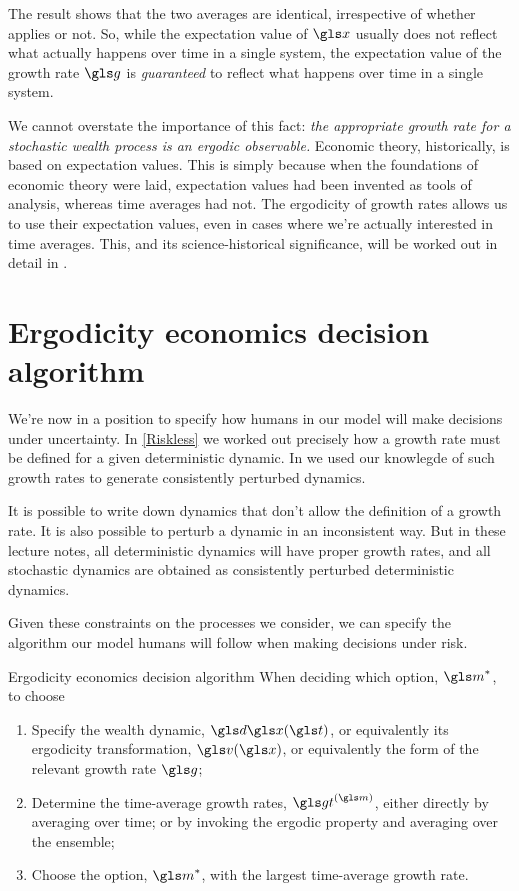 The result shows that the two averages are identical, irrespective of whether  applies or not. 
So, while the expectation value of $\x$ usually does not reflect what actually happens over time in a single 
system, the expectation value of the growth rate $\g$ is {\it guaranteed} to reflect what happens over time in a single system.


We cannot overstate the importance of this fact: {\it the appropriate growth rate for a stochastic wealth process is an 
ergodic observable.} Economic theory, historically, is based on expectation values. This is simply because when the 
foundations of economic theory were laid, expectation values had been invented as tools of analysis, whereas time 
averages had not. The ergodicity of growth rates allows us to use their expectation values, even in cases where 
we're actually interested in time averages. This, and its science-historical significance, will be worked out in detail 
in .

\section{Ergodicity economics decision algorithm}
We're now in a position to specify how humans in our model will make decisions under uncertainty. 
In \cref{Riskless} we worked out precisely how a growth rate must be defined for a given deterministic dynamic. 
In  we used our knowlegde of such growth rates to generate consistently perturbed dynamics. 
 
It is possible to write down dynamics that don't allow the definition of a growth rate. It is also possible to perturb 
a dynamic in an inconsistent way. But in these lecture notes, all deterministic dynamics will have 
proper growth rates, and all stochastic dynamics are obtained as consistently perturbed deterministic 
dynamics.

Given these constraints on the processes we consider, we can specify the algorithm our model humans will 
follow when making decisions under risk.

\begin{keypts}{Ergodicity economics decision algorithm}
When deciding which option, $\m^*$, to choose
\begin{enumerate}
\item Specify the wealth dynamic, $\gd\x(\t)$, or equivalently its ergodicity transformation, $\gv(\x)$, or equivalently the form of the relevant growth rate $\g$;
\item Determine the time-average growth rates, $\gt^{(\m)}$, either directly by averaging over time; or by invoking the 
ergodic property and averaging over the ensemble;
\item Choose the option, $\m^*$, with the largest time-average growth rate.
\end{enumerate}
\end{keypts}


